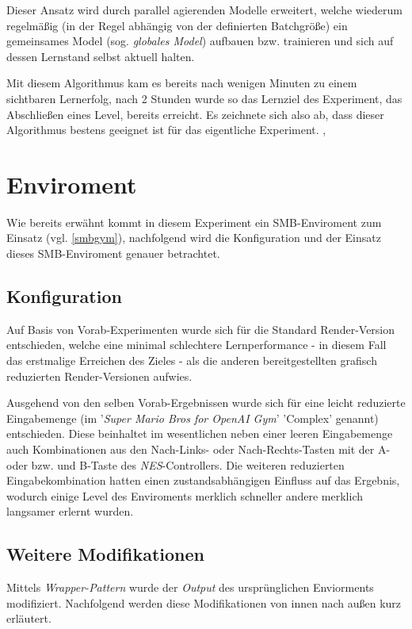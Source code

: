 \documentclass[sigconf,nonacm]{acmart}
\begin{document}
Dieser Ansatz wird durch parallel agierenden Modelle erweitert, welche wiederum regelmäßig (in der Regel abhängig von der definierten Batchgröße) ein gemeinsames Model (sog. \textit{globales Model}) aufbauen bzw. trainieren und sich auf dessen Lernstand selbst aktuell halten.

Mit diesem Algorithmus kam es bereits nach wenigen Minuten zu einem sichtbaren Lernerfolg, nach 2 Stunden wurde so das Lernziel des Experiment, das Abschließen eines Level, bereits erreicht. Es zeichnete sich also ab, dass dieser Algorithmus bestens geeignet ist für das eigentliche Experiment. \cite{a3cchris}, \cite{a3cmedium}

\section{Enviroment}
Wie bereits erwähnt kommt in diesem Experiment ein SMB-Enviroment zum Einsatz (vgl. \ref{smbgym}), nachfolgend wird die Konfiguration und der Einsatz dieses \-SMB-\-Env\-iro\-ment genauer betrachtet.

\subsection{Konfiguration}
\label{smbconfig}
Auf Basis von Vorab-Experimenten wurde sich für die Standard Render-Version entschieden, welche eine minimal schlechtere Lernperformance - in diesem Fall das erstmalige Erreichen des Zieles - als die anderen bereitgestellten grafisch reduzierten Render-Versionen aufwies.

Ausgehend von den selben Vorab-Ergebnissen wurde sich für eine leicht reduzierte Eingabemenge (im '\textit{Super Mario Bros for OpenAI Gym}' \cite{gym-smb} 'Complex' genannt) entschieden. Diese beinhaltet im wesentlichen neben einer leeren Eingabemenge auch  Kombinationen aus den Nach-Links- oder Nach-Rechts-Tasten mit der A- oder bzw. und B-Taste des \textit{NES}-Controllers. Die  weiteren reduzierten Eingabekombination hatten einen zustandsabhängigen Einfluss auf das Ergebnis, wodurch einige Level des Enviroments merklich schneller andere merklich langsamer erlernt wurden.

\subsection{Weitere Modifikationen}
Mittels  \textit{Wrapper-Pattern} wurde der \textit{Output} des ursprünglichen Enviorments modifiziert. Nachfolgend werden diese Modifikationen von innen nach außen kurz erläutert.
\end{document}
